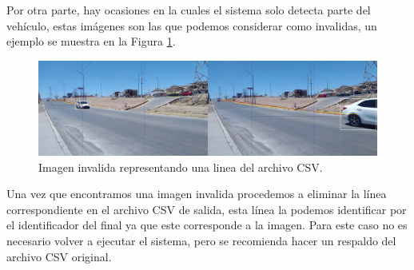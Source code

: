 Por otra parte, hay ocasiones en la cuales el sistema solo detecta parte del vehículo, estas imágenes son las que podemos considerar como invalidas, un ejemplo se muestra en la Figura \ref{fig:ImagenInvalida}.

\begin{figure}[H]
    \centering
    \includegraphics[width=1\textwidth]{Metodologia/imgs/Invalido.jpg}
    \caption{Imagen invalida representando una linea del archivo CSV.}
    \label{fig:ImagenInvalida}
\end{figure}

Una vez que encontramos una imagen invalida procedemos a eliminar la línea correspondiente en el archivo CSV de salida, esta línea la podemos identificar por el identificador del final ya que este corresponde a la imagen. Para este caso no es necesario volver a ejecutar el sistema, pero se recomienda hacer un respaldo del archivo CSV original.
